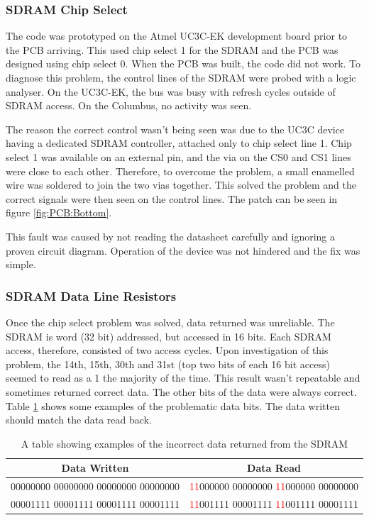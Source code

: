 
\subsubsection{SDRAM Chip Select}
The code was prototyped on the Atmel UC3C-EK development board prior to the PCB arriving. This used chip select 1 for the SDRAM and the PCB was designed using chip select 0. When the PCB was built, the code did not work. To diagnose this problem, the control lines of the SDRAM were probed with a logic analyser. On the UC3C-EK, the bus was busy with refresh cycles outside of SDRAM access. On the Columbus, no activity was seen. 

The reason the correct control wasn't being seen was due to the UC3C device having a dedicated SDRAM controller, attached only to chip select line 1. Chip select 1 was available on an external pin, and the via on the CS0 and CS1 lines were close to each other. Therefore, to overcome the problem, a small enamelled wire was soldered to join the two vias together. This solved the problem and the correct signals were then seen on the control lines. The patch can be seen in figure \ref{fig:PCB:Bottom}. 

This fault was caused by not reading the datasheet carefully and ignoring a proven circuit diagram. Operation of the device was not hindered and the fix was simple.

\subsubsection{SDRAM Data Line Resistors}
Once the chip select problem was solved, data returned was unreliable. The SDRAM is word (32 bit) addressed, but accessed in 16 bits. Each SDRAM access, therefore, consisted of two access cycles. 
Upon investigation of this problem, the 14th, 15th, 30th and 31st (top two bits of each 16 bit access) seemed to read as a 1 the majority of the time. This result wasn't repeatable and sometimes returned correct data. The other bits of the data were always correct. Table \ref{table:SDRAM_Err} shows some examples of the problematic data bits. The data written should match the data read back. 
\begin{table}[!ht]
\caption{A table showing examples of the incorrect data returned from the SDRAM}
\label{table:SDRAM_Err}
\begin{tabular}{cc}\toprule
Data Written							&	Data Read \\ \toprule
00000000 00000000 00000000 00000000		&	\textcolor{red}{11}000000 00000000 \textcolor{red}{11}000000 00000000 \\\midrule
00001111 00001111 00001111 00001111		&	\textcolor{red}{11}001111 00001111 \textcolor{red}{11}001111 00001111 \\ \bottomrule
\end{tabular}
\end{table}

